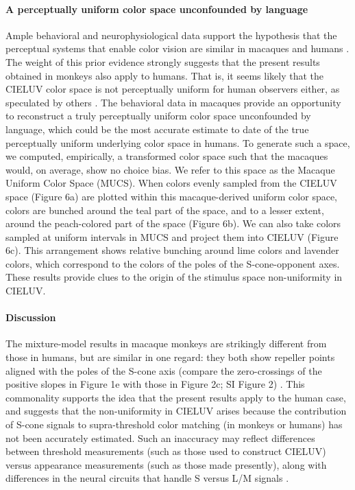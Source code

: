 \documentclass[9pt,biorxiv,lineno,onehalfspacing]{lapreprint}
\begin{document}
\begin{refsection}
\paragraph{A perceptually uniform color space unconfounded by language}

Ample behavioral and neurophysiological data support the hypothesis that the perceptual systems that enable color vision are similar in macaques and humans \citep{schnapf_spectral_1987,gagin_color-detection_2014,horwitz_what_2015,lafer-sousa_color-biased_2016}. The weight of this prior evidence strongly suggests that the present results obtained in monkeys also apply to humans. That is, it seems likely that the CIELUV color space is not perceptually uniform for human observers either, as speculated by others \citep{stockman_colorimetry_2010,judd_ideal_1970}. The behavioral data in macaques provide an opportunity to reconstruct a truly perceptually uniform color space unconfounded by language, which could be the most accurate estimate to date of the true perceptually uniform underlying color space in humans. To generate such a space, we computed, empirically, a transformed color space such that the macaques would, on average, show no choice bias. We refer to this space as the Macaque Uniform Color Space (MUCS). When colors evenly sampled from the CIELUV space (Figure 6a) are plotted within this macaque-derived uniform color space, colors are bunched around the teal part of the space, and to a lesser extent, around the peach-colored part of the space (Figure 6b). We can also take colors sampled at uniform intervals in MUCS and project them into CIELUV (Figure 6c). This arrangement shows relative bunching around lime colors and lavender colors, which correspond to the colors of the poles of the S-cone-opponent axes. These results provide clues to the origin of the stimulus space non-uniformity in CIELUV.

\paragraph{Discussion}

The mixture-model results in macaque monkeys are strikingly different from those in humans, but are similar in one regard: they both show repeller points aligned with the poles of the S-cone axis (compare the zero-crossings of the positive slopes in Figure 1e with those in Figure 2c; SI Figure 2) \citep{skelton_biological_2017,bae_why_2015,panichello_error-correcting_2019}. This commonality supports the idea that the present results apply to the human case, and suggests that the non-uniformity in CIELUV arises because the contribution of S-cone signals to supra-threshold color matching (in monkeys or humans) has not been accurately estimated. Such an inaccuracy may reflect differences between threshold measurements (such as those used to construct CIELUV) versus appearance measurements (such as those made presently), along with differences in the neural circuits that handle S versus L/M signals \citep{RN655, conway_color_2014}. 


\end{refsection}
\end{document}

